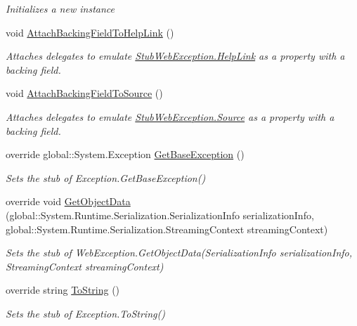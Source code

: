 \begin{DoxyCompactItemize}
\begin{DoxyCompactList}\small\item\em Initializes a new instance\end{DoxyCompactList}\item 
void \hyperlink{class_system_1_1_net_1_1_fakes_1_1_stub_web_exception_a6d8f19af27e14cfcd0ce06246ba202c2}{Attach\-Backing\-Field\-To\-Help\-Link} ()
\begin{DoxyCompactList}\small\item\em Attaches delegates to emulate \hyperlink{class_system_1_1_net_1_1_fakes_1_1_stub_web_exception_af479238bd25ecc77543cfd79198d4f9f}{Stub\-Web\-Exception.\-Help\-Link} as a property with a backing field.\end{DoxyCompactList}\item 
void \hyperlink{class_system_1_1_net_1_1_fakes_1_1_stub_web_exception_a4e5e3c4933c3ef546c5f4d6026c7844f}{Attach\-Backing\-Field\-To\-Source} ()
\begin{DoxyCompactList}\small\item\em Attaches delegates to emulate \hyperlink{class_system_1_1_net_1_1_fakes_1_1_stub_web_exception_a2deea1720cbe46991a88b68511ff7484}{Stub\-Web\-Exception.\-Source} as a property with a backing field.\end{DoxyCompactList}\item 
override global\-::\-System.\-Exception \hyperlink{class_system_1_1_net_1_1_fakes_1_1_stub_web_exception_a6663b2d72b46fc9b834d144bcdb3540f}{Get\-Base\-Exception} ()
\begin{DoxyCompactList}\small\item\em Sets the stub of Exception.\-Get\-Base\-Exception()\end{DoxyCompactList}\item 
override void \hyperlink{class_system_1_1_net_1_1_fakes_1_1_stub_web_exception_a0cf78f17a496dcad5029ed14af15f4c3}{Get\-Object\-Data} (global\-::\-System.\-Runtime.\-Serialization.\-Serialization\-Info serialization\-Info, global\-::\-System.\-Runtime.\-Serialization.\-Streaming\-Context streaming\-Context)
\begin{DoxyCompactList}\small\item\em Sets the stub of Web\-Exception.\-Get\-Object\-Data(\-Serialization\-Info serialization\-Info, Streaming\-Context streaming\-Context)\end{DoxyCompactList}\item 
override string \hyperlink{class_system_1_1_net_1_1_fakes_1_1_stub_web_exception_ac75c0b283916bd0bf5452bcc655d2fc6}{To\-String} ()
\begin{DoxyCompactList}\small\item\em Sets the stub of Exception.\-To\-String()\end{DoxyCompactList}\end{DoxyCompactItemize}
